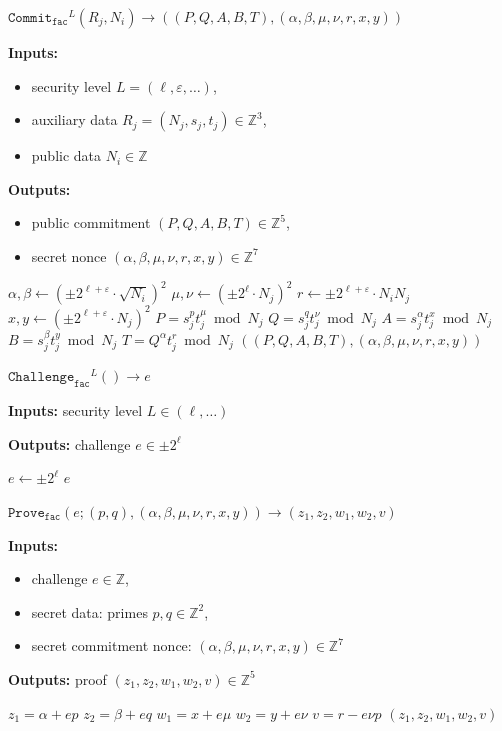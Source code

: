 \documentclass[11pt]{article}
\newenvironment{inlineAlgorithm}{}{}
\newcommand{\algoName}[1]{#1 \par}
\newcommand{\algoInputs}[1]{
    {\small \bf Inputs:} #1 \par
}
\newcommand{\algoInputsList}[1]{
    {\small \bf Inputs:} 
        \begin{itemize}[noitemsep,topsep=0pt]
            #1
        \end{itemize}
}
\newcommand{\algoOutputs}[1]{
    {\small \bf Outputs:} #1 \par
}
\newcommand{\algoOutputsList}[1]{
    {\small \bf Outputs:}
        \begin{itemize}[noitemsep,topsep=0pt]
            #1
        \end{itemize}
}
\newcommand{\commit}[1]{\ensuremath{\mathtt{Commit}_{\mathtt{#1}}}}
\newcommand{\challenge}[1]{\ensuremath{\mathtt{Challenge}_{\mathtt{#1}}}}
\newcommand{\prove}[1]{\ensuremath{\mathtt{Prove}_{\mathtt{#1}}}}
\newcommand{\Z}{\mathbb{Z}}
\newcommand{\?}[1]{\stackrel{?}{#1}}
\begin{document}
\begin{description}

\item
\begin{inlineAlgorithm}
\algoName{$\commit{fac}^L(R_j, N_i) \to ((P, Q, A, B, T), (\alpha, \beta, \mu, \nu, r, x, y))$}
\algoInputsList{
    \item security level $L = (\ell, \varepsilon, \dots)$,
    \item auxiliary data $R_j = (N_j, s_j, t_j) \in \Z^3$,
    \item public data $N_i \in \Z$
}
\algoOutputsList{
    \item public commitment $(P, Q, A, B, T) \in \Z^5$,
    \item secret nonce $(\alpha, \beta, \mu, \nu, r, x, y) \in \Z^7$
}
\begin{algorithmic}[1]
\State $\alpha, \beta \gets (\pm 2^{\ell + \varepsilon} \cdot \sqrt{N_i})^2$
\State $\mu, \nu \gets (\pm 2^{\ell} \cdot N_j)^2$
\State $r \gets \pm 2^{\ell + \varepsilon} \cdot N_i N_j$
\State $x, y \gets (\pm 2^{\ell + \varepsilon} \cdot N_j)^2$
\Statex
\State $P = s_j^{p} t_j^\mu \bmod N_j$ 
\State $Q = s_j^{q} t_j^\nu \bmod N_j$ 
\State $A = s_j^\alpha t_j^x \bmod N_j$ 
\State $B = s_j^\beta t_j^y \bmod N_j$ 
\State $T = Q^\alpha t_j^r \bmod N_j$
\Statex
\State \Return $((P, Q, A, B, T), (\alpha, \beta, \mu, \nu, r, x, y))$
\end{algorithmic}
\end{inlineAlgorithm}

\item
\begin{inlineAlgorithm}
\algoName{$\challenge{fac}^L() \to e$}
\algoInputs{security level $L \in (\ell, \dots)$}
\algoOutputs{challenge $e \in \pm 2^\ell$}
\begin{algorithmic}[1]
\State $e \gets \pm 2^\ell$
\State \Return $e$
\end{algorithmic}
\end{inlineAlgorithm}

\item
\begin{inlineAlgorithm}
\algoName{$\prove{fac}(
    e;
    (p, q),
    (\alpha, \beta, \mu, \nu, r, x, y)
) \to (z_1, z_2, w_1, w_2, v)$}
\algoInputsList{
    \item challenge $e \in \Z$,
    \item secret data: primes $p, q \in \Z^2$,
    \item secret commitment nonce: $(\alpha, \beta, \mu, \nu, r, x, y) \in \Z^7$
}
\algoOutputs{proof $(z_1, z_2, w_1, w_2, v) \in \Z^5$}
\begin{algorithmic}[1]
\State $z_1 = \alpha + ep$
\State $z_2 = \beta + eq$
\State $w_1 = x + e\mu$
\State $w_2 = y + e\nu$
\State $v = r - e \nu p$
\State \Return $(z_1, z_2, w_1, w_2, v)$
\end{algorithmic}
\end{inlineAlgorithm}


\end{description}
\end{document}
